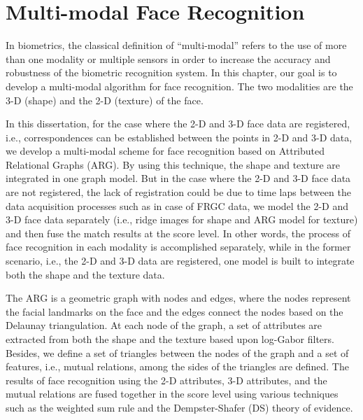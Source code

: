 \chapter{Multi-modal Face Recognition} In biometrics, the classical
definition of ``multi-modal'' refers to the use of more than one
modality or multiple sensors in order to increase the accuracy and
robustness of the biometric recognition system. In this chapter, our
goal is to develop a multi-modal algorithm for face recognition. The
two modalities are the 3-D (shape) and the 2-D (texture) of the
face.

In this dissertation, for the case where the 2-D and 3-D face data
are registered, i.e., correspondences can be established between the
points in 2-D and 3-D data, we develop a multi-modal scheme for face
recognition based on Attributed Relational Graphs (ARG). By using
this technique, the shape and texture are integrated in one graph
model. But in the case where the 2-D and 3-D face data are not
registered, the lack of registration could be due to time laps
between the data acquisition processes such as in case of FRGC data,
we model the 2-D and 3-D face data separately (i.e., ridge images
for shape and ARG model for texture) and then fuse the match results
at the score level. In other words, the process of face recognition
in each modality is accomplished separately, while in the former
scenario, i.e., the 2-D and 3-D data are registered, one model is
built to integrate both the shape and the texture data.

The ARG is a geometric graph with nodes and edges, where the nodes
represent the facial landmarks on the face and the edges connect the
nodes based on the Delaunay triangulation. At each node of the
graph, a set of attributes are extracted from both the shape and the
texture based upon log-Gabor filters. Besides, we define a set of
triangles between the nodes of the graph and a set of features,
i.e., mutual relations, among the sides of the triangles are
defined. The results of face recognition using the 2-D attributes,
3-D attributes, and the mutual relations are fused together in the
score level using various techniques such as the weighted sum rule
and the Dempster-Shafer (DS) theory of evidence.
%

